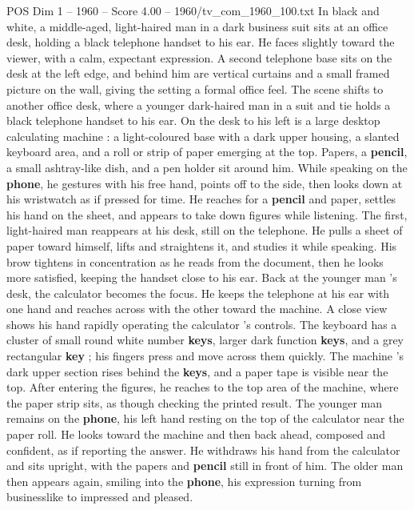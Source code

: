 \begin{textsample}{POS Dim 1 – 1960 – Score 4.00 – 1960/tv\_com\_1960\_100.txt}  \label{ex:f1_pos_078}
In black and white, a middle-aged, light-haired man in a dark business suit sits at an office desk, holding a black telephone handset to his ear.
He faces slightly toward the viewer, with a calm, expectant expression.
A second telephone base sits on the desk at the left edge, and behind him are vertical curtains and a small framed picture on the wall, giving the setting a formal office feel.
The scene shifts to another office desk, where a younger dark-haired man in a suit and tie holds a black telephone handset to his ear.
On the desk to his left is a large desktop calculating machine : a light-coloured base with a dark upper housing, a slanted keyboard area, and a roll or strip of paper emerging at the top.
Papers, a \textbf{pencil}, a small ashtray-like dish, and a pen holder sit around him.
While speaking on the \textbf{phone}, he gestures with his free hand, points off to the side, then looks down at his wristwatch as if pressed for time.
He reaches for a \textbf{pencil} and paper, settles his hand on the sheet, and appears to take down figures while listening.
The first, light-haired man reappears at his desk, still on the telephone.
He pulls a sheet of paper toward himself, lifts and straightens it, and studies it while speaking.
His brow tightens in concentration as he reads from the document, then he looks more satisfied, keeping the handset close to his ear.
Back at the younger man ’s desk, the calculator becomes the focus.
He keeps the telephone at his ear with one hand and reaches across with the other toward the machine.
A close view shows his hand rapidly operating the calculator ’s controls.
The keyboard has a cluster of small round white number \textbf{keys}, larger dark function \textbf{keys}, and a grey rectangular \textbf{key} ; his fingers press and move across them quickly.
The machine ’s dark upper section rises behind the \textbf{keys}, and a paper tape is visible near the top.
After entering the figures, he reaches to the top area of the machine, where the paper strip sits, as though checking the printed result.
The younger man remains on the \textbf{phone}, his left hand resting on the top of the calculator near the paper roll.
He looks toward the machine and then back ahead, composed and confident, as if reporting the answer.
He withdraws his hand from the calculator and sits upright, with the papers and \textbf{pencil} still in front of him.
The older man then appears again, smiling into the \textbf{phone}, his expression turning from businesslike to impressed and pleased.

\end{textsample}
